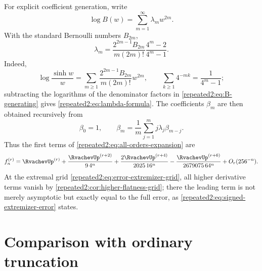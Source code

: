 \documentclass[11pt,oneside]{article}
\theoremstyle{definition}
\theoremstyle{remark}
\begin{document}
For explicit coefficient generation, write
\begin{equation}
 \log B(w)=\sum_{m=1}^{\infty}\lambda_mw^{2m}.
 \label{repeated2:eq:lambda-log}
\end{equation}
With the standard Bernoulli numbers $B_{2m}$,
\begin{equation}
 \lambda_m=
 \frac{2^{2m-1}B_{2m}}{m(2m)!}
 \frac{4^m-2}{4^m-1}.
 \label{repeated2:eq:lambda-formula}
\end{equation}
Indeed,
\[
 \log\frac{\sinh w}{w}
 =\sum_{m\ge1}\frac{2^{2m-1}B_{2m}}{m(2m)!}w^{2m},
 \qquad
 \sum_{k\ge1}4^{-mk}=\frac1{4^m-1};
\]
subtracting the logarithms of the denominator factors in \eqref{repeated2:eq:B-generating} gives
\eqref{repeated2:eq:lambda-formula}.  The coefficients $\beta_m$ are then obtained recursively from
\begin{equation}
 \beta_0=1,
 \qquad
 \beta_m=\frac1m\sum_{j=1}^{m}j\lambda_j\beta_{m-j}.
 \label{repeated2:eq:beta-recurrence}
\end{equation}
Thus the first terms of \eqref{repeated2:eq:all-orders-expansion} are
\begin{equation}
 f_n^{(r)}=\RvachevUp^{(r)}
 +\frac{\RvachevUp^{(r+2)}}{9\,4^n}
 +\frac{2\RvachevUp^{(r+4)}}{2025\,16^n}
 -\frac{\RvachevUp^{(r+6)}}{2679075\,64^n}
 +O_r(256^{-n}).
 \label{repeated2:eq:first-asymptotic-terms}
\end{equation}
At the extremal grid \eqref{repeated2:eq:error-extremizer-grid}, all higher derivative terms vanish
by \cref{repeated2:cor:higher-flatness-grid}; there the leading term is not merely asymptotic but
exactly equal to the full error, as \eqref{repeated2:eq:signed-extremizer-error} states.

\section{Comparison with ordinary truncation}
\label{repeated2:sec:ordinary-truncation}
\end{document}
